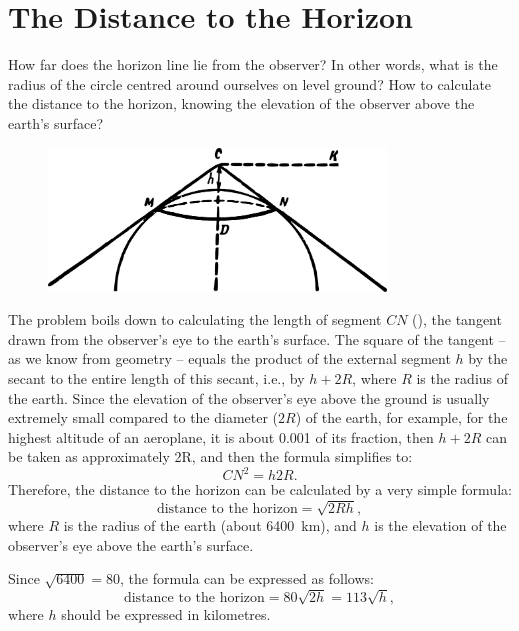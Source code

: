 \section{The Distance to the Horizon}
\label{sec-6.3}

How far does the horizon line lie from the observer? In other words, what is the radius of the circle centred around ourselves on level ground? How to calculate the distance to the horizon, knowing the elevation of the observer above the earth's surface?

\begin{figure}[h!]
\centering
\includegraphics[width=0.8\textwidth]{figures/ch-06/fig-103.pdf}
\end{figure}

The problem boils down to calculating the length of segment $CN$ (), the tangent drawn from the observer's eye to the earth's surface. The square of the tangent -- as we know from geometry -- equals the product of the external segment $h$ by the secant to the entire length of this secant, i.e., by $h + 2R$, where $R$ is the radius of the earth. Since the elevation of the observer's eye above the ground is usually extremely small compared to the diameter ($2R$) of the earth, for example, for the highest altitude of an aeroplane, it is about 0.001 of its fraction, then $h + 2R$  can be taken as approximately 2R, and then the formula simplifies to:
\begin{equation*}%
CN^{2} = h 2R.
\end{equation*}
Therefore, the distance to the horizon can be calculated by a very simple formula:
\begin{equation*}%
\text{distance to the horizon} = \sqrt{2Rh},
\end{equation*}
where $R$ is the radius of the earth (about \SI{6400}{\kilo\meter}), and $h$ is the elevation of the observer's eye above the earth's surface.

Since $\sqrt{6400} = 80$, the formula can be expressed as follows:
\begin{equation*}%
\text{distance to the horizon} = 80\sqrt{2h} = 113\sqrt{h},
\end{equation*}
where $h$ should be expressed in kilometres.

